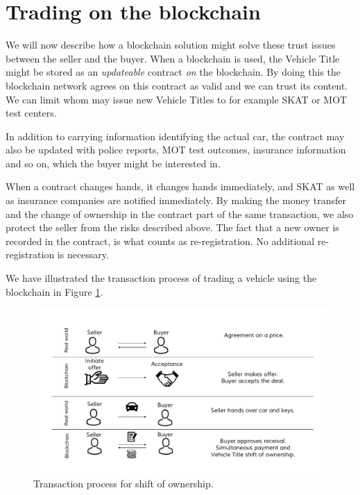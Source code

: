 \documentclass[oneside,a4paper,10pts,article]{memoir}
\begin{document}
\section{Trading on the blockchain}
\label{sec:trading_on_blockchain}
We will now describe how a blockchain solution might solve these trust
issues between the seller and the buyer. When a blockchain is used,
the Vehicle Title might be stored as an \emph{updateable} contract
\emph{on} the blockchain. By doing this the blockchain network agrees
on this contract as valid and we can trust its content. We can limit
whom may issue new Vehicle Titles to for example SKAT or MOT test
centers. 

In addition to carrying information identifying the actual car, the
contract may also be updated with police reports, MOT test outcomes,
insurance information and so on, which the buyer might be interested
in.

When a contract changes hands, it changes hands immediately, and SKAT
as well as insurance companies are notified immediately. By making the
money transfer and the change of ownership in the contract part of the
same transaction, we also protect the seller from the risks described
above. The fact that a new owner is recorded in the contract, is what
counts as re-registration. No additional re-registration is
necessary.

We have illustrated the transaction process of trading a vehicle using
the blockchain in Figure \ref{fig:shift-of-ownership}.

\begin{figure}
  \centering
  \includegraphics[width=\textwidth]{shift-of-ownership.pdf}
  \caption{Transaction process for shift of ownership.}
  \label{fig:shift-of-ownership}
\end{figure}
\end{document}
